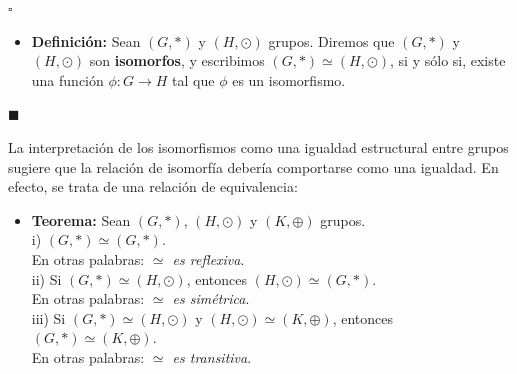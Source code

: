 \documentclass[10 pt]{article}
\begin{document}
\begin{flushright}
    $\square$
\end{flushright}

\begin{itemize}
    \item \Large{\textbf{Definición:} Sean $(G,*)$ y $(H,\odot)$ grupos. Diremos que $(G,*)$ y $(H,\odot)$ son \textbf{isomorfos}, y escribimos \underline{$(G,*) \simeq (H,\odot)$}, si y sólo si, existe una función $\phi:G \rightarrow H$ tal que $\phi$ es un isomorfismo.} \\
\end{itemize}

\begin{flushright}
    $\blacksquare$
\end{flushright}

\Large{La interpretación de los isomorfismos como una igualdad estructural entre grupos sugiere que la relación de isomorfía debería comportarse como una igualdad. En efecto, se trata de una relación de equivalencia:} \\

\begin{itemize}
    \item \Large{\textbf{Teorema:} Sean $(G,*)$, $(H,\odot)$ y $(K,\oplus)$ grupos. \\ 

    i) $(G,*) \simeq (G,*)$. \\

    En otras palabras: \textit{$\simeq$ es reflexiva}. \\

    ii) Si $(G,*) \simeq (H,\odot)$, entonces $(H,\odot) \simeq (G,*)$. \\

    En otras palabras: \textit{$\simeq$ es simétrica}. \\

    iii) Si $(G,*) \simeq (H,\odot)$ y $(H,\odot) \simeq (K,\oplus)$, entonces $(G,*) \simeq (K,\oplus)$. \\

    En otras palabras: \textit{$\simeq$ es transitiva}.} \\
\end{itemize}
\end{document}
